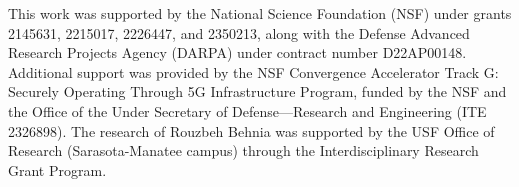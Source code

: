 This work was supported by the National Science Foundation (NSF) under grants 2145631, 2215017, 2226447, and 2350213, along with the Defense Advanced Research Projects Agency (DARPA) under contract number D22AP00148. Additional support was provided by the NSF Convergence Accelerator Track G: Securely Operating Through 5G Infrastructure Program, funded by the NSF and the Office of the Under Secretary of Defense—Research and Engineering (ITE 2326898). The research of Rouzbeh Behnia was supported by the USF Office of Research (Sarasota-Manatee campus) through the Interdisciplinary Research Grant Program.